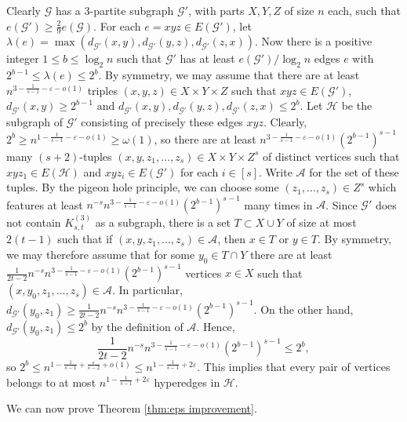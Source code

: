 \documentclass[a4paper,11pt]{article}
\makeatletter
\renewenvironment{proof}[1][\proofname] {\par\pushQED{\qed}\normalfont\topsep6\p@\@plus6\p@\relax\trivlist\item[\hskip\labelsep\bfseries#1\@addpunct{.}]\ignorespaces}{\popQED\endtrivlist\@endpefalse}
\theoremstyle{definition}
\def\eps{\varepsilon}
\def\cG{\mathcal{G}}
\def\cH{\mathcal{H}}
\makeatother
\begin{document}
\begin{proof}
    Clearly $\cG$ has a $3$-partite subgraph $\cG'$, with parts $X,Y,Z$ of size $n$ each, such that $e(\cG')\geq \frac{2}{9}e(\cG)$. For each $e=xyz\in E(\cG')$, let $\lambda(e)=\max(d_{\cG'}(x,y),d_{\cG'}(y,z),d_{\cG'}(z,x))$. Now there is a positive integer $1\leq b\leq \log_2 n$ such that $\cG'$ has at least $e(\cG')/\log_2 n$ edges $e$ with $2^{b-1}\leq \lambda(e)\leq 2^{b}$. By symmetry, we may assume that there are at least $n^{3-\frac{1}{s-1}-\eps-o(1)}$ triples $(x,y,z)\in X\times Y\times Z$ such that $xyz\in E(\cG')$, $d_{\cG'}(x,y)\geq 2^{b-1}$ and $d_{\cG'}(x,y),d_{\cG'}(y,z),d_{\cG'}(z,x)\leq 2^{b}$. Let $\cH$ be the subgraph of $\cG'$ consisting of precisely these edges $xyz$. Clearly, $2^{b}\geq n^{1-\frac{1}{s-1}-\eps-o(1)}\geq \omega(1)$, so there are at least $n^{3-\frac{1}{s-1}-\eps-o(1)}(2^{b-1})^{s-1}$ many $(s+2)$-tuples $(x,y,z_1,\dots,z_s)\in X\times Y\times Z^s$ of distinct vertices such that $xyz_1\in E(\cH)$ and $xyz_i\in E(\cG')$ for each $i\in [s]$. Write $\mathcal{A}$ for the set of these tuples. By the pigeon hole principle, we can choose some $(z_1,\dots,z_s)\in Z^s$ which features at least $n^{-s}n^{3-\frac{1}{s-1}-\eps-o(1)}(2^{b-1})^{s-1}$ many times in $\mathcal{A}$. Since $\cG'$ does not contain $K_{s,t}^{(3)}$ as a subgraph, there is a set $T\subset X\cup Y$ of size at most $2(t-1)$ such that if $(x,y,z_1,\dots,z_s)\in \mathcal{A}$, then $x\in T$ or $y\in T$. By symmetry, we may therefore assume that for some $y_0\in T \cap Y$ there are at least $\frac{1}{2t-2}n^{-s}n^{3-\frac{1}{s-1}-\eps-o(1)}(2^{b-1})^{s-1}$ vertices $x\in X$ such that $(x,y_0,z_1,\dots,z_s)\in \mathcal{A}$. In particular, $d_{\cG'}(y_0,z_1)\geq \frac{1}{2t-2}n^{-s}n^{3-\frac{1}{s-1}-\eps-o(1)}(2^{b-1})^{s-1}$. On the other hand, $d_{\cG'}(y_0,z_1)\leq 2^b$ by the definition of $\mathcal{A}$. Hence,
    $$\frac{1}{2t-2}n^{-s}n^{3-\frac{1}{s-1}-\eps-o(1)}(2^{b-1})^{s-1}\leq 2^b,$$
    so $2^b\leq n^{1-\frac{1}{s-1}+\frac{\eps}{s-2}+o(1)}\leq n^{1-\frac{1}{s-1}+2\eps}$. This implies that every pair of vertices belongs to at most $n^{1-\frac{1}{s-1}+2\eps}$ hyperedges in $\cH$.
\end{proof}

We can now prove Theorem \ref{thm:eps improvement}.
\end{document}
